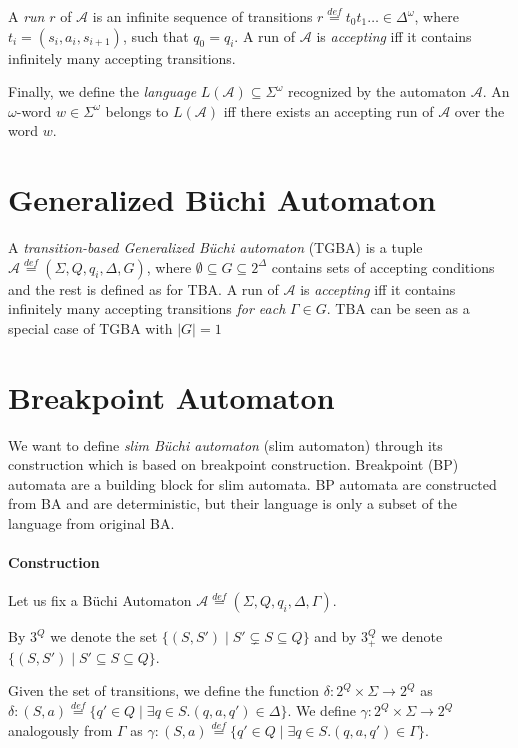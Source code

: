 \documentclass[
	digital
nolof, nolot
]{fithesis3}
\newcommand{\cA}{\mathcal{A}}
\newcommand{\cD}{\mathcal{D}}
\newcommand{\lA}{L(\cA)}
\newcommand{\lD}{L(\cD)}
\newcommand{\eqdef}{\overset{def}{=}}
\begin{document}
			A \emph{run} $r$ of $\cA$ is an infinite sequence of transitions
			$r\eqdef t_0t_1\ldots\in\Delta^\omega$, where $t_i=(s_i, a_i,s_{i+1})$,
			 such that $q_0=q_i$.
			A run of $\cA$ is \emph{accepting} iff it contains infinitely many accepting transitions.

			Finally, we define the \emph{language} $\lA \subseteq \Sigma^\omega$ recognized by the automaton $\cA$. An $\omega$-word $w \in \Sigma^\omega$ belongs to $\lA$ iff there exists an accepting run of $\cA$ over the word $w$. 
			
			
		\section{Generalized Büchi Automaton}
		A \emph{transition-based Generalized Büchi automaton} (TGBA) is a tuple $\cA\eqdef(\Sigma, Q, q_i, \Delta, G)$, where $\emptyset \subseteq G \subseteq 2^\Delta$ contains sets of accepting conditions and the rest is defined as for TBA. A run of $\cA$ is \emph{accepting} iff it contains infinitely many accepting transitions \emph{for each} $\Gamma \in G$. TBA can be seen as a special case of TGBA with $|G|=1$
		
		\section{Breakpoint Automaton} \label{section:bp}
		We want to define \emph{slim Büchi automaton} (slim automaton) through its construction which is based on breakpoint construction.
		Breakpoint (BP) automata are a building block for slim automata. BP automata are constructed from BA and are deterministic, but their language is only a subset of the language from original BA. 
		
		\paragraph{Construction}
		Let us fix a Büchi Automaton $\cA\eqdef(\Sigma, Q, q_i, \Delta, \Gamma)$. 
		
		By $3^Q$ we denote the set $\{(S,S') \mid S'\subsetneq S \subseteq Q\}$ and
		by $3^Q_+$ we denote $\{(S,S') \mid S'\subseteq S \subseteq Q\}$.
		
		
		Given the set of transitions, we define the function $\delta \colon 2^Q \times \Sigma \rightarrow 2^Q$ as 	
			$\delta\colon (S,a)\eqdef\{q'\in Q \mid \exists q \in S.(q,a,q') \in \Delta\}$. We define $\gamma:2^Q  \times \Sigma \rightarrow 2^Q$ analogously from $\Gamma$ as $\gamma: (S,a)\eqdef\{q'\in Q \mid \exists q \in S.(q,a,q') \in \Gamma\}$.
			
\end{document}
